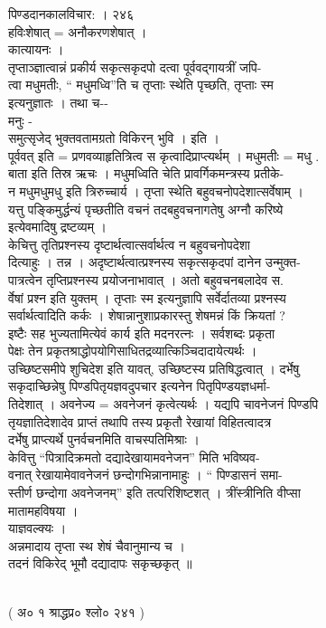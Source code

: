\documentclass[11pt, openany]{book}
\begin{document}
{{{{{ }{ पिण्डदानकालविचार: । २४६}{\\
हविःशेषात् = अनौकरणशेषात् ।\\
कात्यायनः ।\\
तृप्ताञ्ज्ञात्वान्नं प्रकीर्य सकृत्सकृदपो दत्वा पूर्ववद्गायत्रीं जपि-\\
त्वा मधुमतीः, `` मधुमध्वि''ति च तृप्ताः स्थेति पृच्छति, तृप्ताः स्म\\
इत्यनुज्ञातः । तथा च-\/-\\
मनुः -\\
समुत्सृजेद् भुक्तवतामग्रतो विकिरन् भुवि । इति ।\\
पूर्ववत् इति = प्रणवव्याहृतित्रित्व स कृत्वादिप्राप्त्यर्थम् । मधुमतीः =
मधु .\\
बाता इति तिस्र ऋचः । मधुमध्विति चेति प्रावर्गिकमन्त्रस्य प्रतीके-\\
न मधुमधुमधु इति त्रिरुच्चार्य । तृप्ता स्थेति बहुवचनोपदेशात्सर्वेषाम्
।\\
यत्तु पङ्किमुर्द्धन्यं पृच्छतीति वचनं तदबहुवचनागतेषु अग्नौ करिष्ये\\
इत्येवमादिषु द्रष्टव्यम् ।\\
केचित्तु तृतिप्रश्नस्य दृष्टार्थत्वात्सर्वार्थत्व न बहुवचनोपदेशा\\
दित्याहुः । तन्न । अदृष्टार्थत्वात्प्रश्नस्य सकृत्सकृदपां दानेन
उन्मुक्त-\\
पात्रत्वेन तृप्तिप्रश्नस्य प्रयोजनाभावात् । अतो बहुवचनबलादेव स.\\
र्वेषां प्रश्न इति युक्तम् । तृप्ताः स्म इत्यनुज्ञापि सर्वेर्दातव्या
प्रश्नस्य\\
सर्वार्थत्वादिति कर्कः । शेषान्नानुशाप्रकारस्तु शेषमन्नं किं क्रियतां
?\\
इष्टैः सह भुज्यतामित्येवं कार्य इति मदनरत्नः । सर्वशब्दः प्रकृता\\
पेक्षः तेन प्रकृतश्राद्धोपयोगिसाधितद्रव्यात्किञ्चिदादायेत्यर्थः ।\\
उच्छिष्टसमीपे शुचिदेश इति यावत्, उच्छिष्टस्य प्रतिषिद्धत्वात् ।
दर्भेषु\\
सकृदाच्छिन्नेषु पिण्डपितृयज्ञवदुपचार इत्यनेन पितृपिण्डयज्ञधर्मा-\\
तिदेशात् । अवनेज्य = अवनेजनं कृत्वेत्यर्थः । यद्यपि चावनेजनं पिण्डपि\\
तृयज्ञातिदेशादेव प्राप्तं तथापि तस्य प्रकृतौ रेखायां विहितत्वादत्र\\
दर्भेषु प्राप्त्यर्थे पुनर्वचनमिति वाचस्पतिमिश्राः }{।}{\\
केवित्तु ``पित्रादिक्रमतो दद्यादेखायामवनेजन'' मिति भविष्यव-\\
वनात् रेखायामेवावनेजनं छन्दोगभिन्नानामाहुः । `` पिण्डासनं समा-\\
स्तीर्ण छन्दोगा अवनेजनम्'' इति तत्परिशिष्टशत् । त्रींस्त्रीनिति वीप्सा\\
मातामहविषया ।\\
याज्ञवल्क्यः ।\\
अन्नमादाय तृप्ता स्थ शेषं चैवानुमान्य च ।\\
तदनं विकिरेद् भूमौ दद्यादापः सकृच्छकृत् }{॥}{\\
( अ० १ श्राद्धप्र० श्लो० २४१ )

}}}}}
\end{document}
